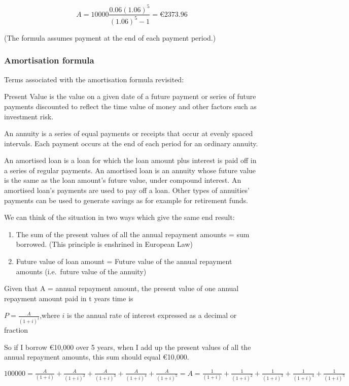 \documentclass[]{book}
\newcommand{\euro}{€}
\theoremstyle{definition}
\theoremstyle{definition}
\theoremstyle{definition}
\theoremstyle{remark}
\begin{document}
\[A= 10 000\frac{0.06(1.06)^5}{(1.06)^5-1}= €2373.96\]

(The formula assumes payment at the end of each payment period.)

\subsubsection{Amortisation formula}\label{amortisation-formula}

Terms associated with the amortisation formula revisited:

Present Value is the value on a given date of a future payment or series
of future payments discounted to reflect the time value of money and
other factors such as investment risk.

An annuity is a series of equal payments or receipts that occur at
evenly spaced intervals. Each payment occurs at the end of each period
for an ordinary annuity.

An amortised loan is a loan for which the loan amount plus interest is
paid off in a series of regular payments. An amortised loan is an
annuity whose future value is the same as the loan amount's future
value, under compound interest. An amortised loan's payments are used to
pay off a loan. Other types of annuities' payments can be used to
generate savings as for example for retirement funds.

We can think of the situation in two ways which give the same end
result:

\begin{enumerate}
\def\labelenumi{\arabic{enumi})}
\item
  The sum of the present values of all the annual repayment amounts =
  sum borrowed. (This principle is enshrined in European Law)
\item
  Future value of loan amount = Future value of the annual repayment
  amounts (i.e.~future value of the annuity)
\end{enumerate}

Given that A = annual repayment amount, the present value of one annual
repayment amount paid in t years time is

\(P= \frac{A}{(1+i)^t}\),where \(i\) is the annual rate of interest
expressed as a decimal or fraction

So if I borrow \euro{}10,000 over 5 years, when I add up the present
values of all the annual repayment amounts, this sum should equal
\euro{}10,000.

\(10 0000 = \frac{A}{(1+i)} + \frac{A}{(1+i)^2} + \frac{A}{(1+i)^3} + \frac{A}{(1+i)^4} + \frac{A}{(1+i)^5} = A =\frac{1}{(1+i)} + \frac{1}{(1+i)^2} + \frac{1}{(1+i)^3} + \frac{1}{(1+i)^4}+ \frac{1}{(1+i)^5}\)
\end{document}
